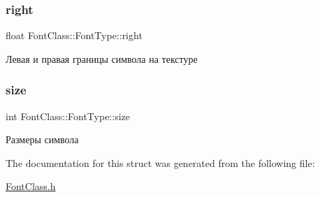 \mbox{\label{struct_font_class_1_1_font_type_a5843dac0db845ade46cc6d5d0732dba0}} 
\subsubsection{\texorpdfstring{right}{right}}
{\footnotesize\ttfamily float Font\+Class\+::\+Font\+Type\+::right}



Левая и правая границы символа на текстуре 

\mbox{\label{struct_font_class_1_1_font_type_a0a02700a2880953d72b9e198822997a6}} 
\subsubsection{\texorpdfstring{size}{size}}
{\footnotesize\ttfamily int Font\+Class\+::\+Font\+Type\+::size}



Размеры символа 



The documentation for this struct was generated from the following file\+:\begin{DoxyCompactItemize}
\item 
\hyperlink{_font_class_8h}{Font\+Class.\+h}\end{DoxyCompactItemize}
